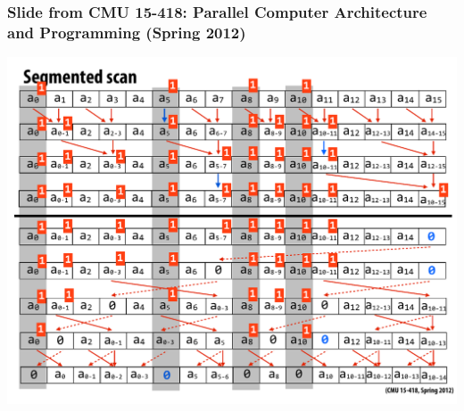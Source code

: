 \documentclass{beamer}
\begin{document}
\begin{frame}[fragile,t]
  \frametitle{{\scriptsize Slide from CMU 15-418: Parallel Computer Architecture and Programming (Spring 2012)}}
\vspace{-3ex}
\begin{center}
\includegraphics[height=50ex]{Figures/L2/SegmExclScan} 
\end  {center}

\end{frame}
\end{document}
